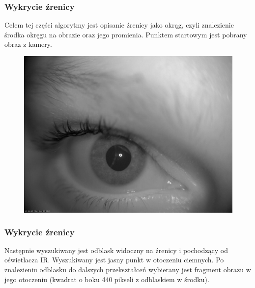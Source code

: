 \documentclass{beamer}
\begin{document}
\begin{frame}
\frametitle{Wykrycie źrenicy}
Celem tej części algorytmy jest opisanie źrenicy jako okrąg, czyli znalezienie środka okręgu na obrazie oraz jego promienia. Punktem startowym jest pobrany obraz z kamery.
\begin{figure}
\begin{center}
\includegraphics[scale=0.13]{szarosc.jpg}
\end{center}
\end{figure}
\end{frame}


\begin{frame}
\frametitle{Wykrycie źrenicy}
Następnie wyszukiwany jest odblask widoczny na źrenicy i pochodzący od oświetlacza IR. Wyszukiwany jest jasny punkt w otoczeniu ciemnych. Po znalezieniu odblasku do dalszych przekształceń wybierany jest fragment obrazu w jego otoczeniu (kwadrat o boku 440 pikseli z odblaskiem w środku).
\end{frame}

\end{document}
